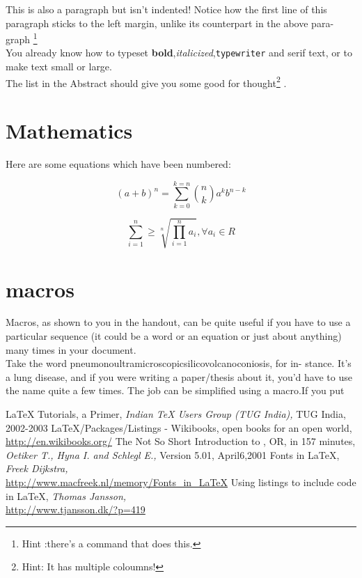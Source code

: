 \documentclass[10pt,oneside,a4paper]{article}
\begin{document}
\noindent This is also a paragraph but isn’t indented! Notice how the first line of this paragraph sticks to the left margin, unlike its counterpart in the above para-graph \footnote{Hint :there's a command that does this.}\\
You already know how to typeset \textbf{bold},\textit{italicized},\texttt{typewriter} and \textsf{serif} text, or to make text \small{small} or \Large{large}.\\

\normalsize The list in the Abstract should give you some good for thought\footnote{Hint: It has multiple coloumns!} .

\section{Mathematics}
Here are some equations which have been numbered:

\begin{equation}
\label{powern}
(a+b)^{n} = \displaystyle \sum_{k=0}^{k=n} \binom{n}{k}a^{k}b^{n-k}
\end{equation}

\begin{equation}
\label{partof:1}
\displaystyle \sum_{i=1}^{n} \geq \sqrt[n]{\prod_{i=1}^{n} a_i} ,\forall a_i \in R 
\end{equation}
\section{macros}
Macros, as shown to you in the handout, can be quite useful if you have to use a particular sequence (it could be a word or an equation or just about anything) many times in your document.\\
Take the word pneumonoultramicroscopicsilicovolcanoconiosis, for in-
stance. It’s a lung disease, and if you were writing a paper/thesis about it, you’d have to use the name quite a few times. The job can be simplified using a macro.If you put

\newpage
\begin{thebibliography}{5}
 \LaTeX{} Tutorials, a Primer, \emph{Indian \TeX{} Users Group (TUG India),} TUG India, 2002-2003
LaTeX/Packages/Listings - Wikibooks, open books for an open world,\\\url{http://en.wikibooks.org/}
The Not So Short Introduction to \LaTeXe, OR, \LaTeXe in 157 minutes,
\emph{Oetiker T., Hyna I. and Schlegl E.,} Version 5.01, April6,2001
 Fonts in \LaTeX, \emph{Freek Dijkstra,}\\
\url{http://www.macfreek.nl/memory/Fonts_in_LaTeX}
 Using listings to include code in \LaTeX{}, \emph{Thomas Jansson,}\\
\url{http://www.tjansson.dk/?p=419}
\end{thebibliography}
\end{document}
